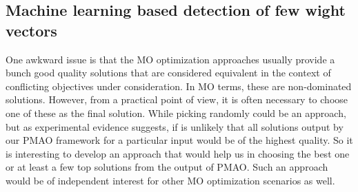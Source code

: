 \subsection{Machine learning based detection of few wight vectors}
One awkward issue is that the MO optimization approaches usually provide a bunch good quality solutions that are considered equivalent in the context of conflicting objectives under consideration. In MO terms, these are non-dominated solutions. However, from a practical point of view, it is often necessary to choose one of these as the final solution. While picking randomly could be an approach, but as experimental evidence suggests, if is unlikely that all solutions output by our PMAO framework for a particular input would be of the highest quality. So it is interesting to develop an approach that would help us in choosing the best one or at least a few top solutions from the output of PMAO. Such an approach would be of independent interest for other MO optimization scenarios as well.   

